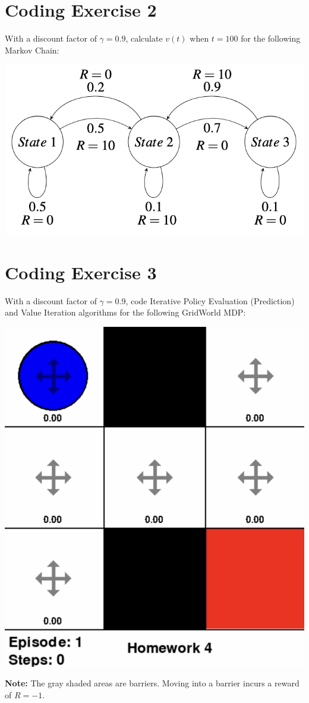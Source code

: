 \documentclass[
  letterpaper,
  DIV=11,
  numbers=noendperiod]{scrreprt}
\makeatletter
\newcommand*\pandocbounded[1]{%
  \sbox\pandoc@box{#1}%
  \Gscale@div\@tempa{\textheight}{\dimexpr\ht\pandoc@box+\dp\pandoc@box\relax}%
  \Gscale@div\@tempb{\linewidth}{\wd\pandoc@box}%
  \ifdim\@tempb\p@<\@tempa\p@\let\@tempa\@tempb\fi%
  \ifdim\@tempa\p@<\p@\scalebox{\@tempa}{\usebox\pandoc@box}%
  \else\usebox{\pandoc@box}%
  \fi%
}
\makeatother
\begin{document}
\section{Coding Exercise 2}\label{coding-exercise-2}

With a discount factor of \(\gamma = 0.9\), calculate \(v(t)\) when
\(t = 100\) for the following Markov Chain:

\begin{center}
\includegraphics[width=0.4\linewidth,height=\textheight,keepaspectratio]{homework/images/hw4-2.png}
\end{center}

\section{Coding Exercise 3}\label{coding-exercise-3}

With a discount factor of \(\gamma = 0.9\), code Iterative Policy
Evaluation (Prediction) and Value Iteration algorithms for the following
GridWorld MDP:

\begin{center}
\includegraphics[width=0.4\linewidth,height=\textheight,keepaspectratio]{homework/images/hw4-3.png}
\end{center}

\textbf{Note:} The gray shaded areas are barriers. Moving into a barrier
incurs a reward of \(R = -1\).

\section{\texorpdfstring{\href{https://colab.research.google.com/drive/1QtZg6Pg_ZDB1D6kFWyEukpxmIvJSrifG?usp=sharing}{\protect\pandocbounded{}}}{}}\label{section-2}
\end{document}
